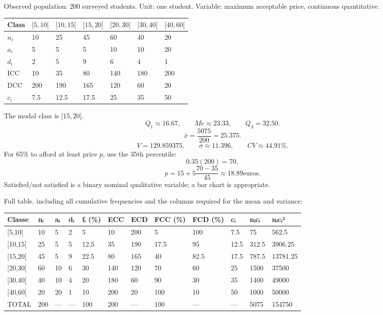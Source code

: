 \documentclass[11pt,a4paper]{article}
\begin{document}
Observed population: 200 surveyed students. Unit: one student. Variable: maximum acceptable price, continuous quantitative.

\begin{longtable}[]{@{}lllllll@{}}
\toprule\noalign{}
Class & {\([5,10[\)} & {\([10,15[\)} & {\([15,20[\)} & {\([20,30[\)} & {\([30,40[\)} & {\([40,60[\)} \\
\midrule\noalign{}
\endhead
\bottomrule\noalign{}
\endlastfoot
{\(n_i\)} & 10 & 25 & 45 & 60 & 40 & 20 \\
{\(a_i\)} & 5 & 5 & 5 & 10 & 10 & 20 \\
{\(d_i\)} & 2 & 5 & 9 & 6 & 4 & 1 \\
ICC & 10 & 35 & 80 & 140 & 180 & 200 \\
DCC & 200 & 190 & 165 & 120 & 60 & 20 \\
{\(c_i\)} & 7.5 & 12.5 & 17.5 & 25 & 35 & 50 \\
\end{longtable}

The modal class is {\([15,20[\)}. {\[Q_1\approx16.67,\qquad
Me\approx23.33,\qquad Q_3=32.50.\]} {\[\bar x=\frac{5075}{200}=25.375.\]} {\[V=129.859375,\qquad \sigma\approx11.396,\qquad
CV\approx44.91\%.\]} For 65\% to afford at least price {\(p\)}, use the 35th percentile: {\[0.35(200)=70,\]} {\[p=15+5\frac{70-35}{45}\approx18.89\text{
euros}.\]} Satisfied/not satisfied is a binary nominal qualitative variable; a bar chart is appropriate.

Full table, including all cumulative frequencies and the columns required for the mean and variance:

\begin{longtable}[]{@{}llllllllllll@{}}
\toprule\noalign{}
Classe & nᵢ & aᵢ & dᵢ & fᵢ (\%) & ECC & ECD & FCC (\%) & FCD (\%) & cᵢ & nᵢcᵢ & nᵢcᵢ² \\
\midrule\noalign{}
\endhead
\bottomrule\noalign{}
\endlastfoot
{[}5,10{[} & 10 & 5 & 2 & 5 & 10 & 200 & 5 & 100 & 7.5 & 75 & 562.5 \\
{[}10,15{[} & 25 & 5 & 5 & 12.5 & 35 & 190 & 17.5 & 95 & 12.5 & 312.5 & 3906.25 \\
{[}15,20{[} & 45 & 5 & 9 & 22.5 & 80 & 165 & 40 & 82.5 & 17.5 & 787.5 & 13781.25 \\
{[}20,30{[} & 60 & 10 & 6 & 30 & 140 & 120 & 70 & 60 & 25 & 1500 & 37500 \\
{[}30,40{[} & 40 & 10 & 4 & 20 & 180 & 60 & 90 & 30 & 35 & 1400 & 49000 \\
{[}40,60{[} & 20 & 20 & 1 & 10 & 200 & 20 & 100 & 10 & 50 & 1000 & 50000 \\
TOTAL & 200 & --- & --- & 100 & 200 & --- & 100 & --- & --- & 5075 & 154750 \\
\end{longtable}
\end{document}
